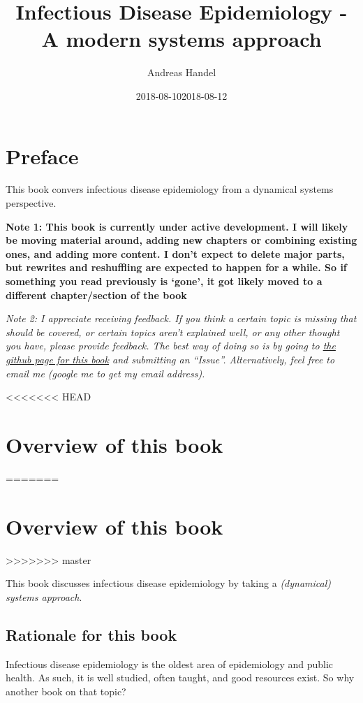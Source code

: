 \documentclass[]{book}
\title{Infectious Disease Epidemiology - A modern systems approach}
\author{Andreas Handel}
\date{2018-08-10}
\date{2018-08-12}
\theoremstyle{definition}
\theoremstyle{definition}
\theoremstyle{definition}
\theoremstyle{remark}
\begin{document}
\maketitle

{
\setcounter{tocdepth}{1}
\tableofcontents
}
\hypertarget{preface}{%
\chapter*{Preface}\label{preface}}

This book convers infectious disease epidemiology from a dynamical
systems perspective.

\textbf{Note 1: This book is currently under active development. I will
likely be moving material around, adding new chapters or combining
existing ones, and adding more content. I don't expect to delete major
parts, but rewrites and reshuffling are expected to happen for a while.
So if something you read previously is `gone', it got likely moved to a
different chapter/section of the book}

\emph{Note 2: I appreciate receiving feedback. If you think a certain
topic is missing that should be covered, or certain topics aren't
explained well, or any other thought you have, please provide feedback.
The best way of doing so is by going to
\href{https://github.com/ahgroup/DSAIDEbook}{the github page for this
book} and submitting an ``Issue''. Alternatively, feel free to email me
(google me to get my email address).}

<<<<<<< HEAD
\hypertarget{overview-of-this-book}{%
\chapter{Overview of this book}\label{overview-of-this-book}}
=======
\chapter{Overview of this book}\label{overview-of-this-book}
>>>>>>> master

This book discusses infectious disease epidemiology by taking a
\emph{(dynamical) systems approach}.

\hypertarget{rationale-for-this-book}{%
\section{Rationale for this book}\label{rationale-for-this-book}}

Infectious disease epidemiology is the oldest area of epidemiology and
public health. As such, it is well studied, often taught, and good
resources exist. So why another book on that topic?
\end{document}
